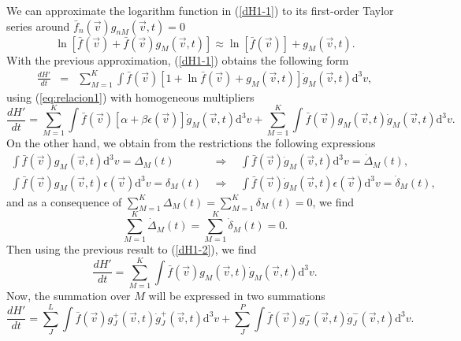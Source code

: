 We can approximate the logarithm function in (\ref{dH1-1}) to its first-order
Taylor series around $\bar f_n(\vec{v}) g_{nM}(\vec{v},t)=0$ 
%
\begin{equation}\label{lnapproximationclassical}
    \ln [\bar{f}(\vec{v})+\bar{f}(\vec{v}) g_{M}(\vec{v},t)] \approx
    \ln [\bar{f}(\vec{v})]+ g_{M}(\vec{v},t).
\end{equation}
%
With the previous approximation, (\ref{dH1-1}) obtains the following form 
%
\begin{eqnarray}
    \frac{dH'}{dt}&=&\sum_{M=1}^{K} \int \bar f(\vec{v})\left[
      1+\ln \bar f(\vec{v})+g_M(\vec{v},t)
    \right]\dot g_M(\vec{v},t)\mathrm{d}^3v,
\end{eqnarray}
%
using (\ref{eq:relacion1}) with homogeneous multipliers
%
\begin{equation}\label{dH1-2}
    \frac{dH'}{dt} = \sum_{M=1}^{K}\int\bar f(\vec{v})\left[
      \alpha+\beta \epsilon(\vec{v})
    \right]\dot g_M(\vec{v},t)\mathrm{d}^3v +\sum_{M=1}^{K}
    \int\bar f(\vec{v})g_M(\vec{v},t)\dot g_M(\vec{v},t)\mathrm{d}^3v . \nonumber 
\end{equation}
%
On the other hand, we obtain from the restrictions the following expressions
%
\begin{eqnarray}
    \int \bar{f}(\vec{v}) g_{M}(\vec{v},t) \mathrm{d}^{3}v=\Delta_M(t) \ \  &\Rightarrow&
    \ \  \int \bar{f}(\vec{v}) \dot{g}_{M}(\vec{v},t)\mathrm{d}^{3}v=\dot{\Delta}_M(t), \nonumber \\
    \int  \bar{f}(\vec{v}) g_{M}(\vec{v},t)\epsilon(\vec{v}) \mathrm{d}^{3}v=\delta_M(t) \ \  &\Rightarrow&
    \ \  \int \bar{f}(\vec{v}) \dot{g}_{M}(\vec{v},t)\epsilon(\vec{v}) \mathrm{d}^{3}v=\dot{\delta}_M(t), \nonumber 
\end{eqnarray}
%
and as a consequence of $\sum_{M=1}^{K} \Delta_M(t) =\sum_{M=1}^{K} \delta_M(t) =0$,
we find
%
\begin{equation}
    \sum_{M=1}^{K} \dot{\Delta}_M(t)  =\sum_{M=1}^{K} \dot{\delta}_{M}(t) =0.
\end{equation}
%
Then using the previous result to (\ref{dH1-2}), we find
%
\begin{equation}
  \frac{dH'}{dt} = \sum_{M=1}^{K}\int\bar f(\vec{v})g_M(\vec{v},t)\dot g_M(\vec{v},t)\mathrm{d}^3v.
\end{equation}
%
Now, the summation over $M$ will be expressed in two summations
%
\begin{equation}\label{classicalH3}
    \frac{dH'}{dt}=\sum_J^{L}\int
      \bar f(\vec{v})g_J^{+}(\vec{v},t)\dot g_J^{+}(\vec{v},t)\mathrm{d}^3v
      +\sum_J^{P}\int
        \bar f(\vec{v})g_J^{-}(\vec{v},t)\dot g_J^{-}(\vec{v},t)\mathrm{d}^3v.
\end{equation}
